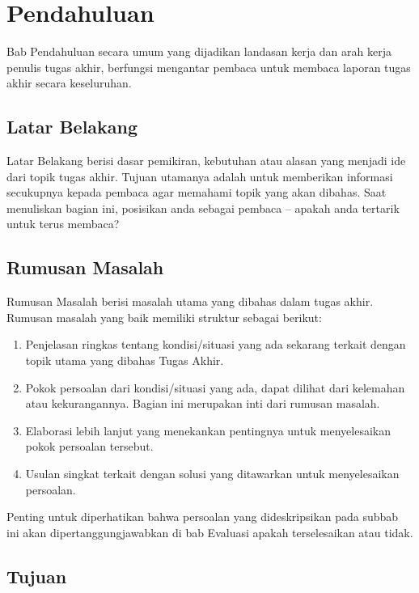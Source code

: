 \chapter{Pendahuluan}

Bab Pendahuluan secara umum yang dijadikan landasan kerja dan arah kerja penulis tugas akhir, berfungsi mengantar pembaca untuk membaca laporan tugas akhir secara keseluruhan.

\section{Latar Belakang}

Latar Belakang berisi dasar pemikiran, kebutuhan atau alasan yang menjadi ide dari topik tugas akhir. Tujuan utamanya adalah untuk memberikan informasi secukupnya kepada pembaca agar memahami topik yang akan dibahas.  Saat menuliskan bagian ini, posisikan anda sebagai pembaca – apakah anda tertarik untuk terus membaca?

\section{Rumusan Masalah}

Rumusan Masalah berisi masalah utama yang dibahas dalam tugas akhir. Rumusan masalah yang baik memiliki struktur sebagai berikut:

\begin{enumerate}
    \item Penjelasan ringkas tentang kondisi/situasi yang ada sekarang terkait dengan topik utama yang dibahas Tugas Akhir.
    \item Pokok persoalan dari kondisi/situasi yang ada, dapat dilihat dari kelemahan atau kekurangannya. Bagian ini merupakan inti dari rumusan masalah.
    \item Elaborasi lebih lanjut yang menekankan pentingnya untuk menyelesaikan pokok persoalan tersebut.
    \item Usulan singkat terkait dengan solusi yang ditawarkan untuk menyelesaikan persoalan.
\end{enumerate}

Penting untuk diperhatikan bahwa persoalan yang dideskripsikan pada subbab ini akan dipertanggungjawabkan di bab Evaluasi apakah terselesaikan atau tidak.

\section{Tujuan}

